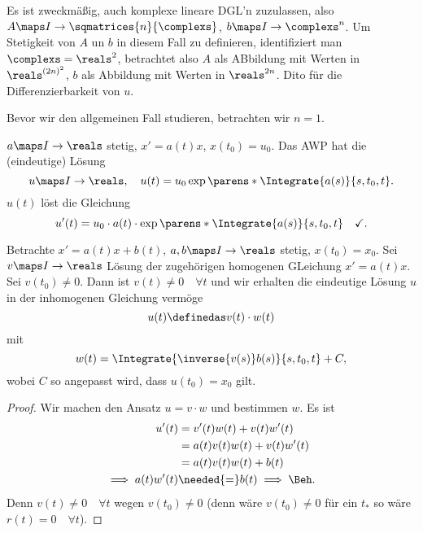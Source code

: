 \begin{bemerkung*}
  Es ist zweckmäßig, auch komplexe lineare DGL'n zuzulassen, also \( A\maps I\to \sqmatrices{n}{\complexs} \), \( b\maps I\to \complexs^n \). Um Stetigkeit von \( A \) un \( b \) in diesem Fall zu definieren, identifiziert man \( \complexs=\reals^2 \), betrachtet also \( A \) als ABbildung mit Werten in \( \reals^{(2n)^2} \), \( b \) als Abbildung mit Werten in \( \reals^{2n} \). Dito für die Differenzierbarkeit von \( u \).
\end{bemerkung*}
Bevor wir den allgemeinen Fall studieren, betrachten wir \( n=1 \).
\begin{beispiel}
  \( a\maps I\to \reals \) stetig, \( x'=a(t)x \), \( x(t_0)=u_0 \). Das AWP hat die (eindeutige) Lösung
  \begin{equation*}
    u\maps I\to \reals,\quad u(t)=u_0\exp\parens*{\Integrate{a(s)}{s,t_0,t}}.
  \end{equation*}
  \( u(t) \) löst die Gleichung
  \begin{equation*}
    u'(t)=u_0\cdot a(t)\cdot \exp\parens*{\Integrate{a(s)}{s,t_0,t}}\quad \checkmark.
  \end{equation*}
\end{beispiel}
\begin{lemma}\label{variation_der_konstanten}
  Betrachte \( x'=a(t)x+b(t) \), \( a,b\maps I\to \reals \) stetig, \( x(t_0)=x_0 \). Sei \( v\maps I\to \reals \) Lösung der zugehörigen homogenen GLeichung \( x'=a(t)x \). Sei \( v(t_0)\neq 0 \). Dann ist \( v(t)\neq 0\quad \forall t \) und wir erhalten die eindeutige Lösung \( u \) in der inhomogenen Gleichung vermöge
  \begin{equation*}
    u(t)\definedas v(t)\cdot w(t)
  \end{equation*}
  mit
  \begin{equation*}
    w(t)=\Integrate{\inverse{v(s)}b(s)}{s,t_0,t}+C,
  \end{equation*}
  wobei \( C \) so angepasst wird, dass \( u(t_0)=x_0 \) gilt.
\end{lemma}
\begin{proof}
  Wir machen den Ansatz \( u=v\cdot w \) und bestimmen \( w \). Es ist 
  \begin{align*}
    u'(t)&=v'(t)w(t)+v(t)w'(t)\\
    &=a(t)v(t)w(t)+v(t)w'(t)\\
    &=a(t)v(t)w(t)+b(t)\\
    \implies a(t)w'(t)&\needed{=}b(t)\implies \text{\Beh.}
  \end{align*}
  Denn \( v(t)\neq 0\quad \forall t \) wegen \( v(t_0)\neq 0 \) (denn wäre \( v(t_0)\neq 0 \) für ein \( t_{*} \) so wäre \( r(t)=0\quad \forall t \)).  
\end{proof}